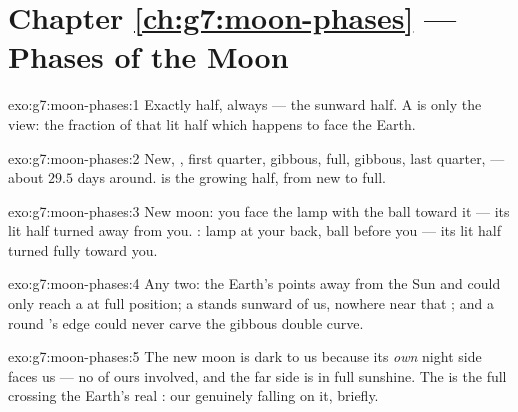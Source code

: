 \section*{Chapter \ref{ch:g7:moon-phases} --- Phases of the Moon}

\begin{solution}{exo:g7:moon-phases:1}
Exactly half, always --- the sunward half. A  is only the
view: the fraction of that lit half which happens to face the
Earth.
\end{solution}

\begin{solution}{exo:g7:moon-phases:2}
New,  , first quarter,  gibbous, full,
 gibbous, last quarter,   --- about $29.5$
days around.  is the growing half, from new to full.
\end{solution}

\begin{solution}{exo:g7:moon-phases:3}
New moon: you face the lamp with the ball toward it --- its lit
half turned away from you. : lamp at your back, ball
before you --- its lit half turned fully toward you.
\end{solution}

\begin{solution}{exo:g7:moon-phases:4}
Any two: the Earth's  points away from the Sun and could
only reach a  at full position; a   stands
sunward of us, nowhere near that ; and a round 's
edge could never carve the gibbous double curve.
\end{solution}

\begin{solution}{exo:g7:moon-phases:5}
The new moon is dark to us because its \emph{own} night side
faces us --- no  of ours involved, and the far side is in
full sunshine. The  is the full  crossing the
Earth's real : our  genuinely falling on it, briefly.
\end{solution}


